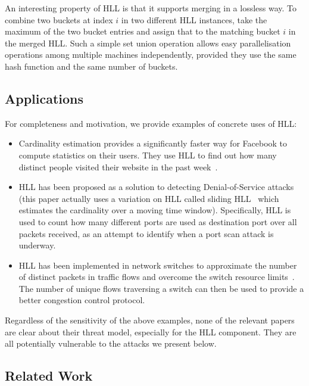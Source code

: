 \documentclass{IEEEtran}
\begin{document}
An interesting property of HLL is that it supports merging in a lossless way. To combine two buckets at index $i$ in two different HLL instances, take the maximum of the two bucket entries and assign that to the matching bucket $i$ in the merged HLL. Such a simple set union operation allows easy parallelisation operations among multiple machines independently, provided they use the same hash function and the same number of buckets.

\subsection{Applications}
For completeness and motivation, we provide examples of concrete uses of HLL:
\begin{itemize}
    \item Cardinality estimation provides a significantly faster way for Facebook to compute statistics on their users. They use HLL to find out how many distinct people visited their website in the past week~\cite{fbhll}.
    \item HLL has been proposed as a solution to detecting Denial-of-Service attacks~\cite{portscanhll} (this paper actually uses a variation on HLL called sliding HLL~\cite{slidinghll} which estimates the cardinality over a moving time window). Specifically, HLL is used to count how many different ports are used as destination port over all packets received, as an attempt to identify when a port scan attack is underway.
        \item HLL has been implemented in network switches to approximate the number of distinct packets in traffic flows and overcome the switch resource limits~\cite{flexswitch}. The number of unique flows traversing a switch can then be used to provide a better congestion control protocol.
        \end{itemize}

Regardless of the sensitivity of the above examples, none of the relevant papers are clear about their threat model, especially for the HLL component.  They are all potentially vulnerable to the attacks we present below.

\subsection{Related Work}
\end{document}

